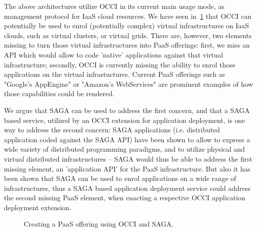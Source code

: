 \documentclass[10pt,conference,final,letterpaper,twoside,twocolumn,]{IEEEtran}
\begin{document}
The above architectures utilize OCCI in its current main usage mode,
as management protocol for IaaS cloud resources.  We have seen
in~\ref{fig:arch3} that OCCI can potentially be used to enrol
(potentially complex) virtual infrastructures on IaaS clouds, such as
virtual clusters, or virtual grids.  There are, however, two elements
missing to turn those virtual infrastructures into PaaS offerings:
first, we miss an API which would allow to code 'native' applications
against that virtual infrastructure; secondly, OCCI is currently
missing the ability to enrol those applications on the virtual
infrastuctures.  Current PaaS offerings such as "Google's AppEngine"
or "Amazon's WebServices" are prominent examples of how those
capabilities could be rendered.

We argue that SAGA can be used to address the first concern, and that
a SAGA based service, utilized by an OCCI extension for application
deployment, is one way to address the second concern: SAGA
applications (i.e. distributed application coded against the SAGA API)
have been shown to allow to express a wide variety of distributed
programming paradigms, and to utilize physical and virtual distributed
infrastructures -- SAGA would thus be able to address the first
missing element, an 'application API' for the PaaS infrastructure.
But also it has been shown that SAGA can be used to enrol applications
on a wide range of infrastructures, thus a SAGA based application
deployment service could address the second missing PaaS element, when
enacting a respective OCCI application deployment extension.

 \begin{figure}[htb]
  \caption{\label{fig:arch3} Creating a PaaS offering using OCCI and SAGA.}
 \end{figure}

\end{document}
